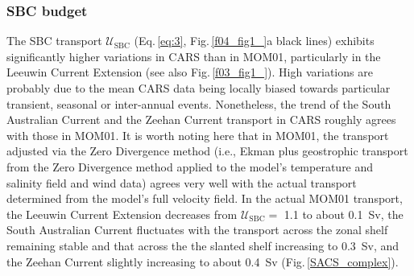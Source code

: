 \documentclass[preprint,3p,review,12pt]{elsarticle}
\newcommand{\sub}[1]{_{\text{#1}}}
\begin{document}
\subsubsection{SBC budget}\label{SBC budget}
The SBC transport $\mathcal{U}\sub{SBC}$ (Eq.\,\ref{eq:3}, Fig.\,\ref{f04_fig1_}a black lines) exhibits significantly higher variations in CARS than in MOM01, particularly in the Leeuwin Current Extension (see also Fig.\,\ref{f03_fig1_}).
High variations are probably due to the mean CARS data being locally biased towards particular transient, seasonal or inter-annual events. Nonetheless, the trend of the South Australian Current and the Zeehan Current transport in CARS
roughly agrees with those in MOM01. It is worth noting here that in MOM01, the transport adjusted via the Zero Divergence method (i.e., Ekman plus geostrophic transport from the Zero Divergence method applied to the model's temperature and salinity field and wind data) agrees very well with the actual transport determined from the model's full velocity field. In the actual MOM01 transport, the Leeuwin Current Extension decreases from $\mathcal{U}\sub{SBC} =$ \num{1.1} to about \SI{0.1}{Sv}, the South Australian Current fluctuates with the transport across the zonal shelf remaining stable and that across the the slanted shelf increasing to \SI{0.3}{Sv}, and the Zeehan Current slightly increasing to about \SI{0.4}{Sv} (Fig.\,\ref{SACS_complex}).
%
\end{document}
